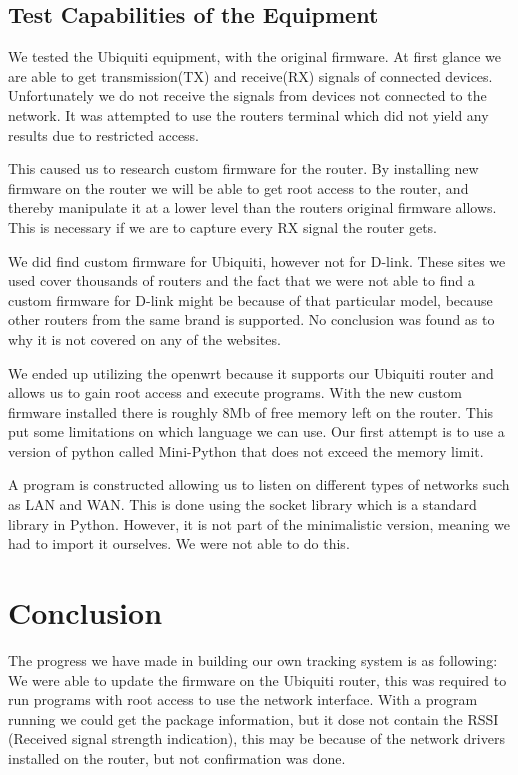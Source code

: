 \subsection*{Test Capabilities of the Equipment}
We tested the Ubiquiti equipment, with the original firmware. At first glance we are able to get transmission(TX) and receive(RX) signals of connected devices. Unfortunately we do not receive the signals from devices not connected to the network. It was attempted to use the routers terminal which did not yield any results due to restricted access.

This caused us to research custom firmware for the router. By installing new firmware on the router we will be able to get root access to the router, and thereby manipulate it at a lower level than the routers original firmware allows. This is necessary if we are to capture every RX signal the router gets.

We did find custom firmware for Ubiquiti, however not for D-link. These sites we used cover thousands of routers and the fact that we were not able to find a custom firmware for D-link might be because of that particular model, because other routers from the same brand is supported. No conclusion was found as to why it is not covered on any of the websites\cite{firmware_1}\cite{firmware_2}\cite{firmware_3}\cite{firmware_4}\cite{firmware_5}\cite{firmware_6}.

We ended up utilizing the openwrt because it supports our Ubiquiti router and allows us to gain root access and execute programs. With the new custom firmware installed there is roughly 8Mb of free memory left on the router. This put some limitations on which language we can use. Our first attempt is to use a version of python called Mini-Python that does not exceed the memory limit.

A program is constructed allowing us to listen on different types of networks such as LAN and WAN. This is done using the socket library which is a standard library in Python. However, it is not part of the minimalistic version, meaning we had to import it ourselves. We were not able to do this.

\section*{Conclusion}
The progress we have made in building our own tracking system is as following: We were able to update the firmware on the Ubiquiti router, this was required to run programs with root access to use the network interface. With a program running we could get the package information, but it dose not contain the RSSI (Received signal strength indication), this may be because of the network drivers installed on the router, but not confirmation was done. 